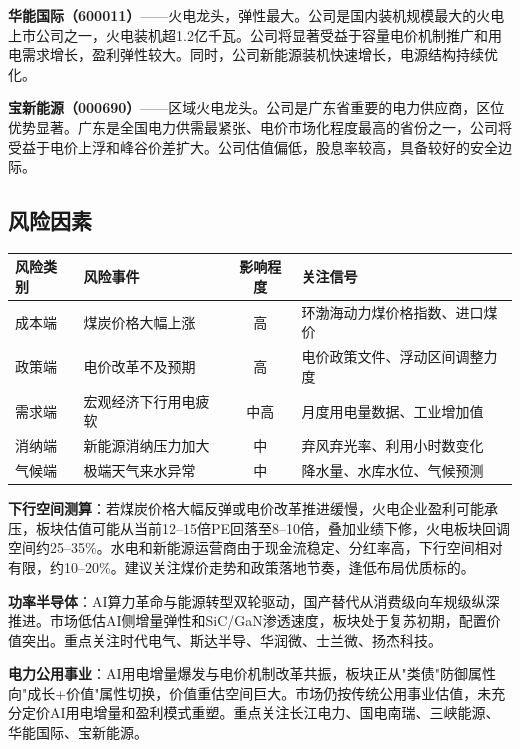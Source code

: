 \textbf{华能国际（600011）}——火电龙头，弹性最大。公司是国内装机规模最大的火电上市公司之一，火电装机超1.2亿千瓦。公司将显著受益于容量电价机制推广和用电需求增长，盈利弹性较大。同时，公司新能源装机快速增长，电源结构持续优化。

\vspace{0.2em}

\textbf{宝新能源（000690）}——区域火电龙头。公司是广东省重要的电力供应商，区位优势显著。广东是全国电力供需最紧张、电价市场化程度最高的省份之一，公司将受益于电价上浮和峰谷价差扩大。公司估值偏低，股息率较高，具备较好的安全边际。

\subsection{风险因素}

\begin{riskbox}[电力公用事业板块主要风险因素]
\small
\setlength{\aboverulesep}{0pt}
\setlength{\belowrulesep}{0pt}
\begin{tabularx}{\linewidth}{X L{2.8cm} c L{4.5cm}}
\toprule
\textbf{风险类别} & \textbf{风险事件} & \textbf{影响程度} & \textbf{关注信号} \\
\midrule
成本端 & 煤炭价格大幅上涨 & \textcolor{riskred}{高} & 环渤海动力煤价格指数、进口煤价 \\
政策端 & 电价改革不及预期 & \textcolor{riskred}{高} & 电价政策文件、浮动区间调整力度 \\
需求端 & 宏观经济下行用电疲软 & \textcolor{riskamber}{中高} & 月度用电量数据、工业增加值 \\
消纳端 & 新能源消纳压力加大 & \textcolor{riskamber}{中} & 弃风弃光率、利用小时数变化 \\
气候端 & 极端天气来水异常 & \textcolor{riskamber}{中} & 降水量、水库水位、气候预测 \\
\bottomrule
\end{tabularx}
\end{riskbox}

\textbf{下行空间测算}：若煤炭价格大幅反弹或电价改革推进缓慢，火电企业盈利可能承压，板块估值可能从当前12--15倍PE回落至8--10倍，叠加业绩下修，火电板块回调空间约25--35\%。水电和新能源运营商由于现金流稳定、分红率高，下行空间相对有限，约10--20\%。建议关注煤价走势和政策落地节奏，逢低布局优质标的。

\vspace{0.5em}

\begin{keyinsight}[本章核心观点]
\textbf{功率半导体}：AI算力革命与能源转型双轮驱动，国产替代从消费级向车规级纵深推进。市场低估AI侧增量弹性和SiC/GaN渗透速度，板块处于复苏初期，配置价值突出。重点关注时代电气、斯达半导、华润微、士兰微、扬杰科技。

\vspace{0.3em}

\textbf{电力公用事业}：AI用电增量爆发与电价机制改革共振，板块正从"类债"防御属性向"成长+价值"属性切换，价值重估空间巨大。市场仍按传统公用事业估值，未充分定价AI用电增量和盈利模式重塑。重点关注长江电力、国电南瑞、三峡能源、华能国际、宝新能源。
\end{keyinsight}
